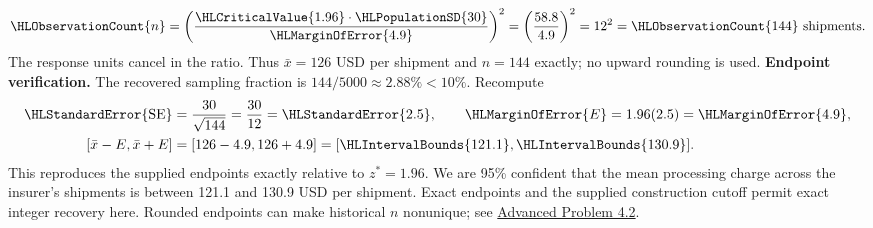 \[\HLObservationCount{n}=\left(\frac{\HLCriticalValue{1.96}\cdot\HLPopulationSD{30}}{\HLMarginOfError{4.9}}\right)^2=\left(\frac{58.8}{4.9}\right)^2=12^2=\HLObservationCount{144}\text{ shipments}.\]
The response units cancel in the ratio. Thus $\bar x=126$ USD per shipment and $n=144$ exactly; no upward rounding is used.
\textbf{Endpoint verification.} The recovered sampling fraction is $144/5000\approx 2.88\%<10\%$. Recompute
\[\begin{aligned}
\HLStandardError{\mathrm{SE}}&=\frac{30}{\sqrt{144}}=\frac{30}{12}=\HLStandardError{2.5},\qquad \HLMarginOfError{E}=1.96(2.5)=\HLMarginOfError{4.9},\\
[\bar x-E,\bar x+E]&=[126-4.9,126+4.9]=[\HLIntervalBounds{121.1},\HLIntervalBounds{130.9}].
\end{aligned}\]
This reproduces the supplied endpoints exactly relative to $z^*=1.96$. We are 95\% confident that the mean processing charge across the insurer's shipments is between 121.1 and 130.9 USD per shipment.
Exact endpoints and the supplied construction cutoff permit exact integer recovery here. Rounded endpoints can make historical $n$ nonunique; see \hyperref[prob:c4-advanced-2]{Advanced Problem 4.2}.
\clearpage
